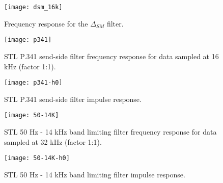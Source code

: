 \begin{figure}[hbtp]
  \begin{center}
 \texttt{[image: dsm\_16k]}

  \end{center}
  \caption{\SF Frequency response for the $\Delta_{SM}$ filter.
               \label{delta-sm-frq}
          }

\end{figure}


\begin{figure}[hbtp]
  \begin{center}
 \texttt{[image: p341]}
  \end{center}
  \caption{\SF STL P.341 send-side filter frequency response for data
               sampled at 16 kHz (factor 1:1).
           \label{tx-p341-frq}
          }
\end{figure}


\begin{figure}[hbtp]
  \begin{center}
 \texttt{[image: p341-h0]}
  \end{center}
  \caption{\SF STL P.341 send-side filter impulse response.
           \label{tx-p341-ir}
          }
\end{figure}


\begin{figure}[hbtp]
  \begin{center}
  \texttt{[image: 50-14K]}
  \end{center}
  \caption{\SF STL 50 Hz - 14 kHz band limiting filter frequency response for data
               sampled at 32 kHz (factor 1:1).
           \label{50_14k-32k-frq}
          }
\end{figure}


\begin{figure}[hbtp]
  \begin{center}
 \texttt{[image: 50-14K-h0]}
  \end{center}
  \caption{\SF STL 50 Hz - 14 kHz band limiting filter impulse response.
           \label{50_14k-32k-ir}
          }
\end{figure}

